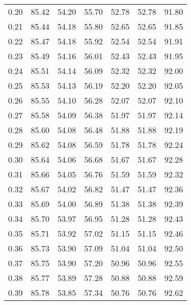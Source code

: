 \begin{tabular}{|c|c|c|c|c|c|c|}
      0.20 &     85.42 &     54.20 &      55.70 &   52.78 &      52.78 &         91.80 \\
      0.21 &     85.44 &     54.18 &      55.80 &   52.65 &      52.65 &         91.85 \\
      0.22 &     85.47 &     54.18 &      55.92 &   52.54 &      52.54 &         91.91 \\
      0.23 &     85.49 &     54.16 &      56.01 &   52.43 &      52.43 &         91.95 \\
      0.24 &     85.51 &     54.14 &      56.09 &   52.32 &      52.32 &         92.00 \\
      0.25 &     85.53 &     54.13 &      56.19 &   52.20 &      52.20 &         92.05 \\
      0.26 &     85.55 &     54.10 &      56.28 &   52.07 &      52.07 &         92.10 \\
      0.27 &     85.58 &     54.09 &      56.38 &   51.97 &      51.97 &         92.14 \\
      0.28 &     85.60 &     54.08 &      56.48 &   51.88 &      51.88 &         92.19 \\
      0.29 &     85.62 &     54.08 &      56.59 &   51.78 &      51.78 &         92.24 \\
      0.30 &     85.64 &     54.06 &      56.68 &   51.67 &      51.67 &         92.28 \\
      0.31 &     85.66 &     54.05 &      56.76 &   51.59 &      51.59 &         92.32 \\
      0.32 &     85.67 &     54.02 &      56.82 &   51.47 &      51.47 &         92.36 \\
      0.33 &     85.69 &     54.00 &      56.89 &   51.38 &      51.38 &         92.39 \\
      0.34 &     85.70 &     53.97 &      56.95 &   51.28 &      51.28 &         92.43 \\
      0.35 &     85.71 &     53.92 &      57.02 &   51.15 &      51.15 &         92.46 \\
      0.36 &     85.73 &     53.90 &      57.09 &   51.04 &      51.04 &         92.50 \\
      0.37 &     85.75 &     53.90 &      57.20 &   50.96 &      50.96 &         92.55 \\
      0.38 &     85.77 &     53.89 &      57.28 &   50.88 &      50.88 &         92.59 \\
      0.39 &     85.78 &     53.85 &      57.34 &   50.76 &      50.76 &         92.62 \\

\end{tabular}

